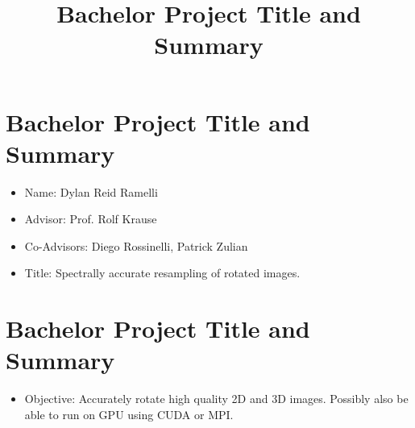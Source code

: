 \documentclass[]{article}
\title{Bachelor Project Title and Summary}
\author{}
\begin{document}
\section*{Bachelor Project Title and Summary}
	\begin{itemize}
		\item Name: Dylan Reid Ramelli
		\item Advisor: Prof. Rolf Krause
		\item Co-Advisors: Diego Rossinelli, Patrick Zulian
		\item Title: Spectrally accurate resampling of rotated images.
	\end{itemize}


\section*{Bachelor Project Title and Summary}
	\begin{itemize}
		\item \small Objective: Accurately rotate high quality 2D and 3D images. Possibly also be able to run on GPU using CUDA or MPI.
	\end{itemize}
\end{document}
